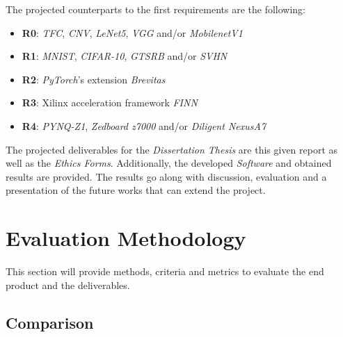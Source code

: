 The projected counterparts to the first requirements are the following:
\begin{itemize}
  \item \textbf{R0}: \emph{TFC}, \emph{CNV}, \emph{LeNet5}, \emph{VGG} and/or \emph{MobilenetV1}
  \item \textbf{R1}: \emph{MNIST}, \emph{CIFAR-10}, \emph{GTSRB} and/or \emph{SVHN}
  \item \textbf{R2}: \emph{PyTorch}'s extension \emph{Brevitas}
  \item \textbf{R3}: Xilinx acceleration framework \emph{FINN}
  \item \textbf{R4}: \emph{PYNQ-Z1}, \emph{Zedboard z7000} and/or \emph{Diligent NexusA7}
\end{itemize}

The projected deliverables for the \emph{Dissertation Thesis} are this given report as well as the \emph{Ethics Forms}. Additionally, the developed \emph{Software} and obtained results are provided. The results go along with discussion, evaluation and a presentation of the future works that can extend the project.


\section{Evaluation Methodology}

This section will provide methods, criteria and metrics to evaluate the end product and the deliverables.


\subsection{Comparison}


